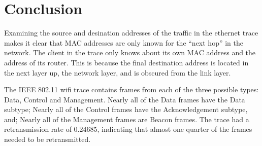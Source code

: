 \section{Conclusion}\label{sec:conclusion}
Examining the source and desination addresses of the traffic in the ethernet trace makes it clear that MAC addresses are only known for the ``next hop'' in the network. The client in the trace only knows about its own MAC address and the address of its router. This is because the final destination address is located in the next layer up, the network layer, and is obscured from the link layer.

The IEEE 802.11 wifi trace contains frames from each of the three possible types: Data, Control and Management. Nearly all of the Data frames have the Data subtype; Nearly all of the Control frames have the Acknowledgement subtype, and; Nearly all of the Management frames are Beacon frames. The trace had a retransmission rate of 0.24685, indicating that almost one quarter of the frames needed to be retransmitted.
